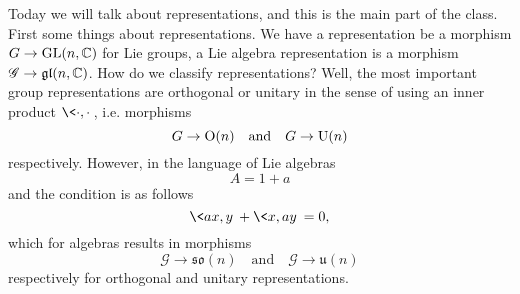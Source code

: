 Today we will talk about representations, and this is the main
part of the class. First some things about representations. We
have a representation be a morphism $G\to{\rm GL}(n,\Bbb{C})$ for Lie
groups, a Lie algebra representation is a morphism
$\mathscr{G}\to\mathfrak{gl}(n,\Bbb{C})$. How do we classify
representations? Well, the most important group representations
are orthogonal or unitary in the sense of using an inner product
$\<\cdot,\cdot\>$, i.e. morphisms
\begin{equation}
G\to{\rm O}(n)\quad\mbox{and}\quad G\to{\rm U}(n)
\end{equation}
respectively. However, in the language of Lie algebras
\begin{equation}
A = 1 + a
\end{equation}
and the condition is as follows
\begin{equation}
\<ax,y\>+\<x,ay\>=0,
\end{equation}
which for algebras results in morphisms
\begin{equation}
\mathscr{G}\to\mathfrak{so}(n)\quad\mbox{and}\quad\mathscr{G}\to\mathfrak{u}(n)
\end{equation}
respectively for orthogonal and unitary representations.

